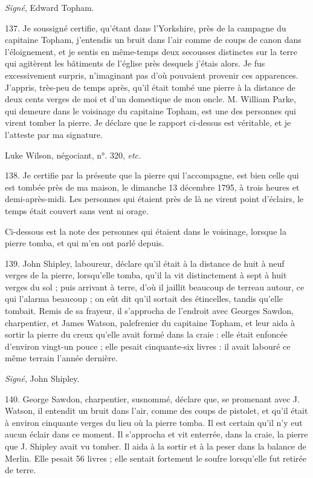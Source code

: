\documentclass[a4paper, 11pt, oneside, polutonikogreek, french]{article}
\begin{document}
\emph{Signé}, Edward Topham.

137. Je soussigné certifie, qu'étant dans l'Yorkshire, près de la campagne du capitaine Topham, j'entendis un bruit dans l'air comme de coups de canon dans l'éloignement, et je sentis en même-temps deux secousses distinctes sur la terre qui agitèrent les bâtiments de l'église près desquels j'étais alors. Je fus excessivement surpris, n'imaginant pas d'où pouvaient provenir ces apparences. J'appris, très-peu de temps après, qu'il était tombé une pierre à la distance de deux cents verges de moi et d'un domestique de mon oncle. M. William Parke, qui demeure dans le voisinage du capitaine Topham, est une des personnes qui virent tomber la pierre. Je déclare que le rapport ci-dessus est véritable, et je l'atteste par ma signature.

Luke Wilson, négociant, n°. 320, \emph{etc.}

138. Je certifie par la présente que la pierre qui l'accompagne, est bien celle qui est tombée près de ma maison, le dimanche 13 décembre 1795, à trois heures et demi-après-midi. Les personnes qui étaient près de là ne virent point d'éclairs, le temps était couvert sans vent ni orage.

Ci-dessous est la note des personnes qui étaient dans le voisinage, lorsque la pierre tomba, et qui m'en ont parlé depuis.

139. John Shipley, laboureur, déclare qu'il était à la distance de huit à neuf verges de la pierre, lorsqu'elle tomba, qu'il la vit distinctement à sept à huit verges du sol ; puis arrivant à terre, d'où il jaillit beaucoup de terreau autour, ce qui l'alarma beaucoup ; on eût dit qu'il sortait des étincelles, tandis qu'elle tombait. Remis de sa frayeur, il s'approcha de l'endroit avec Georges Sawdon, charpentier, et James Watson, palefrenier du capitaine Topham, et leur aida à sortir la pierre du creux qu'elle avait formé dans la craie : elle était enfoncée d'environ vingt-un pouce ; elle pesait cinquante-six livres : il avait labouré ce même terrain l'année dernière.

\emph{Signé}, John Shipley.

140. George Sawdon, charpentier, susnommé, déclare que, se promenant avec J. Watson, il entendit un bruit dans l'air, comme des coups de pistolet, et qu'il était à environ cinquante verges du lieu où la pierre tomba. Il est certain qu'il n'y eut aucun éclair dans ce moment. Il s'approcha et vit enterrée, dans la craie, la pierre que J. Shipley avait vu tomber. Il aida à la sortir et à la peser dans la balance de Merlin. Elle pesait 56 livres ; elle sentait fortement le soufre lorsqu'elle fut retirée de terre.
\end{document}
